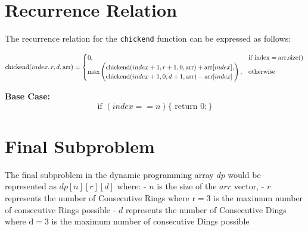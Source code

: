 \documentclass[8pt]{article}
\begin{document}
\section{Recurrence Relation}

   The recurrence relation for the \texttt{chickend} function can be expressed as follows:

\[
\text{chickend}(index, r, d, \text{arr}) = 
\begin{cases} 
    0, & \text{if } \text{index} = \text{arr.size()} \\ 
    \max\left( 
        \begin{array}{@{}l@{}}
            \text{chickend}(index + 1, r + 1, 0, \text{arr}) + \text{arr}[index], \\ 
            \text{chickend}(index + 1, 0, d + 1, \text{arr}) - \text{arr}[index] 
        \end{array} 
    \right), & \text{otherwise}
\end{cases}
\]



\textbf{Base Case:}
\newline
\newline
\[
\text{if } (index == n) \{
    \text{ return } 0;
\}
\]


\section{Final Subproblem}
The final subproblem in the dynamic programming array $dp$ would be represented as
\newline
\newline
\phantom{fddvddjndnjdnjhjddndjnsndjnfnjvjfnvjfnjdjdssvs}\textit{$dp[n][r][d]$} 
\newline
\newline
where:
- $n$ is the size of the $arr$ vector,
- $r$ represents the number of Consecutive Rings where r$=$3 is the maximum number of consecutive Rings possible
- $d$ represents the number of Consecutive Dings where d$=$3 is the maximum number of consecutive Dings possible
\end{document}
